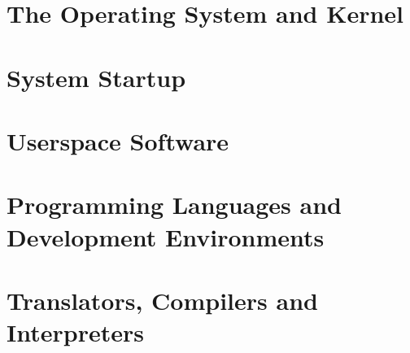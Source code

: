 \documentclass[../main.tex]{subfiles}
\begin{document}
\section{The Operating System and Kernel}
\label{4:sec:the_os_and_kernel}


\section{System Startup}
\label{4:sec:system_startup}


\section{Userspace Software}
\label{4:sec:userspace_software}


\section{Programming Languages and Development Environments}
\label{4:sec:programming_languages_and_development_environments}


\section{Translators, Compilers and Interpreters}
\label{4:sec:translators_compilers_and_interpreters}

\end{document}
